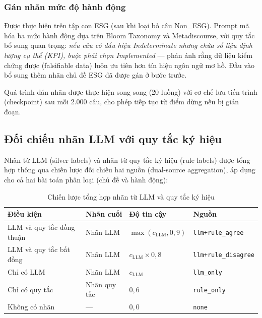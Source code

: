 \subsubsection{Gán nhãn mức độ hành động}

Được thực hiện trên tập con ESG (sau khi loại bỏ câu Non\_ESG). Prompt mã hóa ba mức hành động dựa trên Bloom Taxonomy và Metadiscourse, với quy tắc bổ sung quan trọng: \textit{nếu câu có dấu hiệu Indeterminate nhưng chứa số liệu định lượng cụ thể (KPI), buộc phải chọn Implemented} --- phản ánh rằng dữ liệu kiểm chứng được (falsifiable data) luôn ưu tiên hơn tín hiệu ngôn ngữ mơ hồ. Đầu vào bổ sung thêm nhãn chủ đề ESG đã được gán ở bước trước.

Quá trình dán nhãn được thực hiện song song (20 luồng) với cơ chế lưu tiến trình (checkpoint) sau mỗi 2.000 câu, cho phép tiếp tục từ điểm dừng nếu bị gián đoạn.


\subsection{Đối chiếu nhãn LLM với quy tắc ký hiệu}
\label{subsec:label_aggregation}

Nhãn từ LLM (silver labels) và nhãn từ quy tắc ký hiệu (rule labels) được tổng hợp thông qua chiến lược đối chiếu hai nguồn (dual-source aggregation), áp dụng cho cả hai bài toán phân loại (chủ đề và hành động):

\begin{table}[htbp]
\centering
\caption{Chiến lược tổng hợp nhãn từ LLM và quy tắc ký hiệu}
\label{tab:label_aggregation}
\small
\renewcommand{\arraystretch}{1.3}
\begin{tabular}{|>{\raggedright\arraybackslash}p{3.5cm}
                |>{\raggedright\arraybackslash}p{2.5cm}
                |>{\raggedright\arraybackslash}p{3cm}
                |>{\raggedright\arraybackslash}p{4cm}|}
\hline
\textbf{Điều kiện} & \textbf{Nhãn cuối} & \textbf{Độ tin cậy} & \textbf{Nguồn} \\
\hline
LLM và quy tắc đồng thuận & Nhãn LLM & $\max(c_{\text{LLM}}, 0{,}9)$ & \texttt{llm+rule\_agree} \\
\hline
LLM và quy tắc bất đồng & Nhãn LLM & $c_{\text{LLM}} \times 0{,}8$ & \texttt{llm+rule\_disagree} \\
\hline
Chỉ có LLM & Nhãn LLM & $c_{\text{LLM}}$ & \texttt{llm\_only} \\
\hline
Chỉ có quy tắc & Nhãn quy tắc & $0{,}6$ & \texttt{rule\_only} \\
\hline
Không có nhãn & --- & $0{,}0$ & \texttt{none} \\
\hline
\end{tabular}
\end{table}

